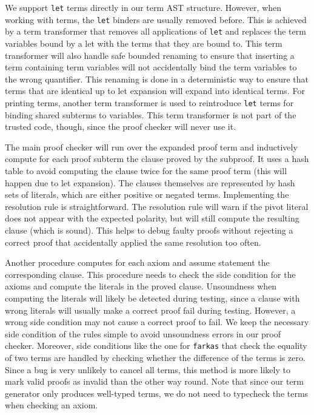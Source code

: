 \documentclass[a4paper]{easychair}
\newcommand\smtlib[1]{\texttt{#1}}
\begin{document}
We support \smtlib{let} terms directly in our term AST structure.
However, when working with terms, the \smtlib{let} binders are usually removed before.
This is achieved by a term transformer that removes all applications of \smtlib{let} and replaces the term variables bound by a let with the terms that they are bound to.
This term transformer will also handle safe bounded renaming to ensure that inserting a term containing term variables will not accidentally bind the term variables to the wrong quantifier.
This renaming is done in a deterministic way to ensure that terms that are identical up to let expansion will expand into identical terms.
For printing terms, another term transformer is used to reintroduce \smtlib{let} terms for binding shared subterms to variables.
This term transformer is not part of the trusted code, though, since the proof checker will never use it.

The main proof checker will run over the expanded proof term and inductively compute for each proof subterm the clause proved by the subproof.
It uses a hash table to avoid computing the clause twice for the same proof term (this will happen due to let expansion).
The clauses themselves are represented by hash sets of literals, which are either positive or negated terms.
Implementing the resolution rule is straightforward.
The resolution rule will warn if the pivot literal does not appear with the expected polarity, but will still compute the resulting clause (which is sound).
This helps to debug faulty proofs without rejecting a correct proof that accidentally applied the same resolution too often.

Another procedure computes for each axiom and assume statement the corresponding clause.
This procedure needs to check the side condition for the axioms and compute the literals in the proved clause.
Unsoundness when computing the literals will likely be detected during testing, since a clause with wrong literals will usually make a correct proof fail during testing.
However, a wrong side condition may not cause a correct proof to fail.
We keep the necessary side condition of the rules simple to avoid unsoundness errors in our proof checker.
Moreover, side conditions like the one for \smtlib{farkas} that check the equality of two terms are handled by checking whether the difference of the terms is zero.
Since a bug is very unlikely to cancel all terms, this method is more likely to mark valid proofs as invalid than the other way round.
Note that since our term generator only produces well-typed terms, we do not need to typecheck the terms when checking an axiom.
\end{document}
